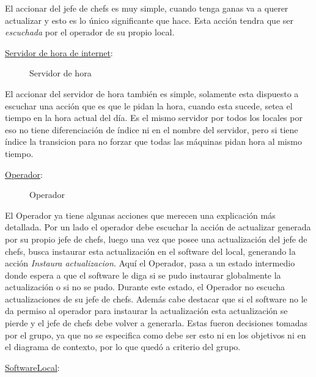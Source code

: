 \documentclass[a4paper,10pt]{article}
\begin{document}
El accionar del jefe de chefs es muy simple, cuando tenga ganas va a querer actualizar y esto es lo \'unico significante que hace. Esta acci\'on tendra que ser \emph{escuchada} por el operador de su propio local.

\bigskip

\noindent \underline{Servidor de hora de internet}:

\begin{figure}[H]
\centering
{}
\caption{Servidor de hora}
\end{figure}

El accionar del servidor de hora tambi\'en es simple, solamente esta dispuesto a escuchar una acci\'on que es que le pidan la hora, cuando esta sucede, setea el tiempo en la hora actual del d\'ia. Es el mismo servidor por todos los locales por eso no tiene diferenciaci\'on de \'indice ni en el nombre del servidor, pero si tiene \'indice la transicion para no forzar que todas las m\'aquinas pidan hora al mismo tiempo.

\bigskip

\noindent \underline{Operador}: 

\begin{figure}[H]
\centering
{}
\caption{Operador}
\end{figure}

El Operador ya tiene algunas acciones que merecen una explicaci\'on m\'as detallada. Por un lado el operador debe escuchar la acci\'on de actualizar generada por su propio jefe de chefs, luego una vez que posee una actualizaci\'on del jefe de chefs, busca instaurar esta actualizaci\'on en el software del local, generando la acci\'on \emph{Instaura actualizacion}. Aqu\'i el Operador, pasa a un estado intermedio donde espera a que el software le diga si se pudo instaurar globalmente la actualizaci\'on o si no se pudo. Durante este estado, el Operador no escucha actualizaciones de su jefe de chefs. Adem\'as cabe destacar que si el software no le da permiso al operador para instaurar la actualizaci\'on esta actualizaci\'on se pierde y el jefe de chefs debe volver a generarla. Estas fueron decisiones tomadas por el grupo, ya que no se especifica como debe ser esto ni en los objetivos ni en el diagrama de contexto, por lo que qued\'o a criterio del grupo.

\bigskip

\noindent \underline{SoftwareLocal}:
\end{document}
